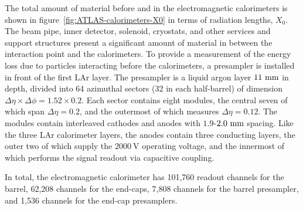 The total amount of material before and in the electromagnetic calorimeters is shown in figure~\ref{fig:ATLAS-calorimeters-X0} in terms of radiation lengths, $X_0$. The beam pipe, inner detector, solenoid, cryostats, and other services and support structures present a significant amount of material in between the interaction point and the calorimeters. To provide a measurement of the energy loss due to particles interacting before the calorimeters, a presampler is installed in front of the first LAr layer. The presampler is a liquid argon layer $11~\mathrm{mm}$ in depth, divided into 64 azimuthal sectors (32 in each half-barrel) of dimension $\Delta\eta\times\Delta\phi=1.52\times0.2$. Each sector contains eight modules, the central seven of which span $\Delta\eta=0.2$, and the outermost of which measures $\Delta\eta=0.12$.  The modules contain interleaved cathodes and anodes with $1.9$-$2.0~\mathrm{mm}$ spacing. Like the three LAr calorimeter layers, the anodes contain three conducting layers, the outer two of which supply the $2000~\mbox{V}$ operating voltage, and the innermost of which performs the signal readout via capacitive coupling.

In total, the electromagnetic calorimeter has 101,760 readout channels for the barrel, 62,208 channels for the end-caps, 7,808 channels for the barrel presampler, and 1,536 channels for the end-cap presamplers. 


